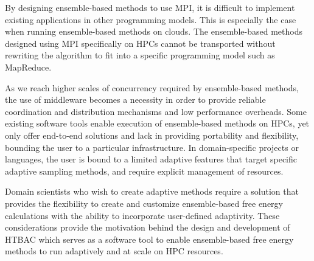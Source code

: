 By designing ensemble-based methods to use MPI, it is difficult to implement
existing applications in other programming models. This is especially the
case when running ensemble-based methods on clouds. The ensemble-based
methods designed using MPI specifically on HPCs cannot be transported without
rewriting the algorithm to fit into a specific programming model such as
MapReduce.

As we reach higher scales of concurrency required by ensemble-based methods,
the use of middleware becomes a necessity in order to provide reliable
coordination and distribution mechanisms and low performance overheads. Some
existing software tools enable execution of ensemble-based methods on HPCs,
yet only offer end-to-end solutions and lack in providing portability and
flexibility, bounding the user to a particular infrastructure. In
domain-specific projects or languages, the user is bound to a limited
adaptive features that target specific adaptive sampling methods, and require
explicit management of resources.

Domain scientists who wish to create adaptive methods require a solution that
provides the flexibility to create and customize ensemble-based free energy
calculations with the ability to incorporate user-defined adaptivity. These
considerations provide the motivation behind the design and development of
HTBAC which serves as a software tool to enable ensemble-based free energy
methods to run adaptively and at scale on HPC resources.



